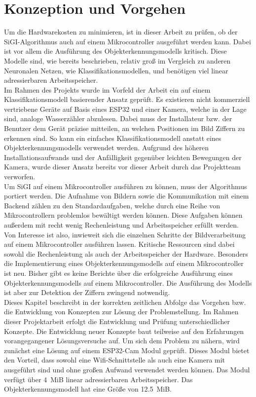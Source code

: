 \chapter{Konzeption und Vorgehen }\label{ch:Konzeption}
    Um die Hardwarekosten zu minimieren, ist in dieser Arbeit zu prüfen, ob der SiGI-Algorithmus auch auf einem Mikrocontroller ausgeführt werden kann. Dabei ist vor allem die Ausführung des Objekterkennungsmodells kritisch. Diese Modelle sind, wie bereits beschrieben, relativ groß im Vergleich zu anderen Neuronalen Netzen, wie Klassifikationsmodellen, und benötigen viel linear adressierbaren Arbeitsspeicher.\\ Im Rahmen des Projekts wurde im Vorfeld der Arbeit ein auf einem Klassifikationsmodell basierender Ansatz geprüft. Es existieren nicht kommerziell vertriebene Geräte auf Basis eines ESP32 und einer Kamera, welche in der Lage sind, analoge Wasserzähler abzulesen. Dabei muss der Installateur bzw. der Benutzer dem Gerät präzise mitteilen, an welchen Positionen im Bild Ziffern zu erkennen sind. So kann ein einfaches Klassifikationsmodell anstatt eines Objekterkennungsmodells verwendet werden. Aufgrund des höheren Installationsaufwands und der Anfälligkeit gegenüber leichten Bewegungen der Kamera, wurde dieser Ansatz bereits vor dieser Arbeit durch das Projektteam verworfen.\\ Um SiGI auf einem Mikrocontroller ausführen zu können, muss der Algorithmus portiert werden. Die Aufnahme von Bildern sowie die Kommunikation mit einem Backend zählen zu den Standardaufgaben, welche durch eine Reihe von Mikrocontrollern problemlos bewältigt werden können. Diese Aufgaben können außerdem mit recht wenig Rechenleistung und Arbeitsspeicher erfüllt werden. Von Interesse ist also, inwieweit sich die einzelnen Schritte der Bildverarbeitung auf einem Mikrocontroller ausführen lassen. Kritische Ressourcen sind dabei sowohl die Rechenleistung als auch der Arbeitsspeicher der Hardware. Besonders die Implementierung eines Objekterkennungsmodells auf einem Mikrocontroller ist neu. Bisher gibt es keine Berichte über die erfolgreiche Ausführung eines Objekterkennungsmodells auf einem Mikrocontroller. Die Ausführung des Modells ist aber zur Detektion der Ziffern zwingend notwendig.\\ Dieses Kapitel beschreibt in der korrekten zeitlichen Abfolge das Vorgehen bzw. die Entwicklung von Konzepten zur Lösung der Problemstellung. Im Rahmen dieser Projektarbeit erfolgt die Entwicklung und Prüfung unterschiedlicher Konzepte. Die Entwicklung neuer Konzepte baut teilweise auf den Erfahrungen vorangegangener Lösungsversuche auf. Um sich dem Problem zu nähern, wird zunächst eine Lösung auf einem ESP32-Cam Modul geprüft. Dieses Modul bietet den Vorteil, dass sowohl eine Wifi-Schnittstelle als auch eine Kamera mit ausgeführt sind und ohne großen Aufwand verwendet werden können. Das Modul verfügt über \SI{4}{MiB} linear adressierbaren Arbeitsspeicher. Das Objekterkennungsmodell hat eine Größe von \SI{12,5}{MiB}.

